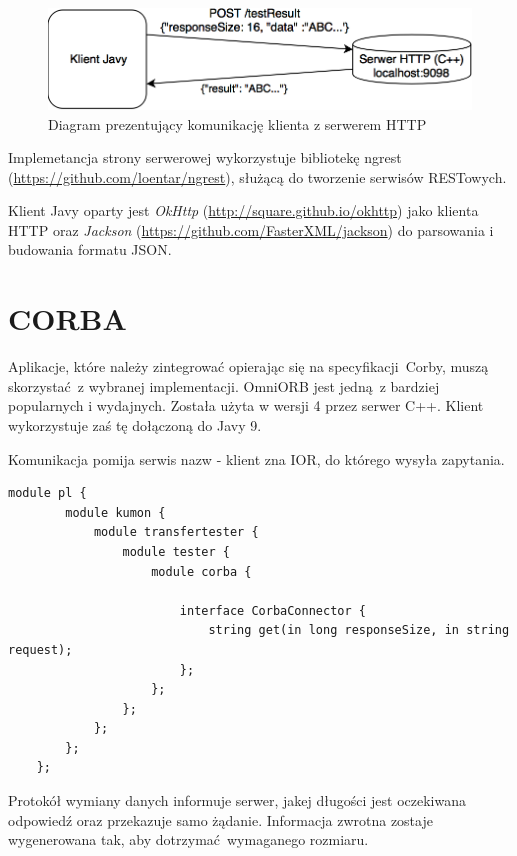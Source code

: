 \begin{figure}[h!]
    \centering
    \includegraphics[width=\textwidth,height=\textheight,keepaspectratio]{img/rest_impl_diagram.png}
    \caption{Diagram prezentujący komunikację klienta z serwerem HTTP}
\end{figure}

Implemetancja strony serwerowej wykorzystuje bibliotekę ngrest (\url{https://github.com/loentar/ngrest}), służącą do tworzenie serwisów RESTowych.

Klient Javy oparty jest \textit{OkHttp} (\url{http://square.github.io/okhttp}) jako klienta HTTP oraz \textit{Jackson} \newline (\url{https://github.com/FasterXML/jackson}) do parsowania i budowania formatu JSON.


\section{CORBA}

Aplikacje, które należy zintegrować opierając się na specyfikacji Corby, muszą skorzystać z wybranej implementacji. OmniORB jest jedną z bardziej popularnych i wydajnych. Została użyta w wersji 4 przez serwer C++. Klient wykorzystuje zaś tę dołączoną do Javy 9.

Komunikacja pomija serwis nazw - klient zna IOR, do którego wysyła zapytania.

\begin{lstlisting}[caption={Zastosowany interfejs (IDL)},captionpos=b]
    module pl {
        module kumon {
            module transfertester {
                module tester {
                    module corba {

                        interface CorbaConnector {
                            string get(in long responseSize, in string request);
                        };
                    };
                };
            };
        };
    };
\end{lstlisting}

Protokół wymiany danych informuje serwer, jakej długości jest oczekiwana odpowiedź oraz przekazuje samo żądanie. Informacja zwrotna zostaje wygenerowana tak, aby dotrzymać wymaganego rozmiaru.


